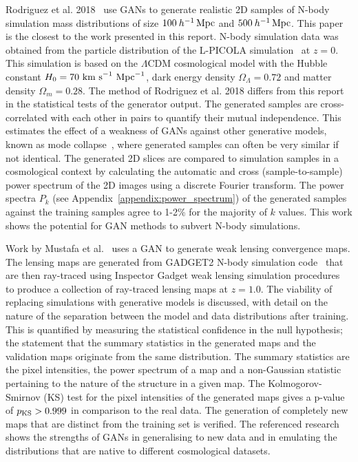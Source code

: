 \documentclass[twocolumn]{article}
\numberwithin{equation}{section}
\begin{document}
Rodriguez et al. 2018~\cite{web_gan} use GANs to generate realistic 2D samples of N-body simulation mass distributions of size $100 \: h^{-1} \,\textup{Mpc}$ and $500 \: h^{-1} \,\textup{Mpc}$. This paper is the closest to the work presented in this report. N-body simulation data was obtained from the particle distribution of the L-PICOLA simulation~\cite{LPICOLA} at $z=0$. This simulation is based on the $\Lambda \text{CDM}$ cosmological model with the Hubble constant $H_0=70\textup{ km s}^{-1}\textup{ Mpc}^{-1}$, dark energy density $\Omega_\Lambda=0.72$ and matter density $\Omega_m=0.28$. The method of Rodriguez et al. 2018 differs from this report in the statistical tests of the generator output. The generated samples are cross-correlated with each other in pairs to quantify their mutual independence. This estimates the effect of a weakness of GANs against other generative models, known as mode collapse~\cite{gf_gan}, where generated samples can often be very similar if not identical. The generated 2D slices are compared to simulation samples in a cosmological context by calculating the automatic and cross (sample-to-sample) power spectrum of the 2D images using a discrete Fourier transform. The power spectra $P_k$ (see Appendix~\ref{appendix:power_spectrum}) of the generated samples against the training samples agree to 1-2\% for the majority of $k$ values. This work shows the potential for GAN methods to subvert N-body simulations. 

Work by Mustafa et al.~\cite{cosmogan} uses a GAN to generate weak lensing convergence maps. The lensing maps are generated from GADGET2 N-body simulation code~\cite{gadget2} that are then ray-traced using Inspector Gadget weak lensing simulation procedures~\cite{mink_funcs, lens_peaks, lens_peak_counts} to produce a collection of ray-traced lensing maps at $z=1.0$. The viability of replacing simulations with generative models is discussed, with detail on the nature of the separation between the model and data distributions after training. This is quantified by measuring the statistical confidence in the null hypothesis; the statement that the summary statistics in the generated maps and the validation maps originate from the same distribution. The summary statistics are the pixel intensities, the power spectrum of a map and a non-Gaussian statistic pertaining to the nature of the structure in a given map. The Kolmogorov-Smirnov (KS) test for the pixel intensities of the generated maps gives a p-value of $p_{\textup{KS}} > 0.999$ in comparison to the real data. The generation of completely new maps that are distinct from the training set is verified. The referenced research shows the strengths of GANs in generalising to new data and in emulating the distributions that are native to different cosmological datasets.
\end{document}
